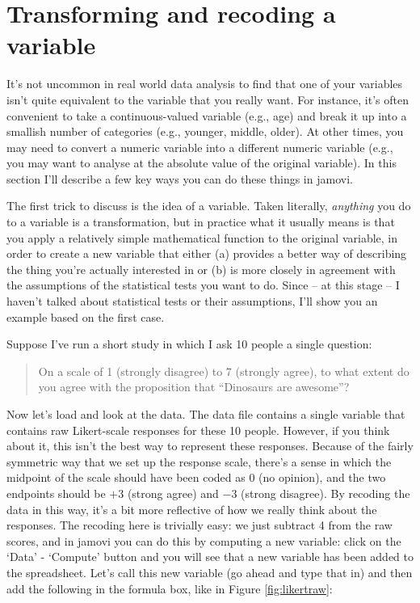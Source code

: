 \section{Transforming and recoding a variable~\label{sec:transform}}

It's not uncommon in real world data analysis to find that one of your variables isn't quite equivalent to the variable that you really want. For instance, it's often convenient to take a continuous-valued variable (e.g., age) and break it up into a smallish number of categories (e.g., younger, middle, older). At other times, you may need to convert a numeric variable into a different numeric variable (e.g., you may want to analyse at the absolute value of the original variable). In this section I'll describe a few key ways you can do these things in jamovi. 



The first trick to discuss is the idea of  a variable. Taken literally, {\it anything} you do to a variable is a transformation, but in practice what it usually means is that you apply a relatively simple mathematical function to the original variable, in order to create a new variable that either (a) provides a better way of describing the thing you're actually interested in or (b) is more closely in agreement with the assumptions of the statistical tests you want to do.  Since -- at this stage -- I haven't talked about statistical tests or their assumptions, I'll show you an example based on the first case. 

Suppose I've run a short study in which I ask 10 people a single question: 
\begin{quote}
On a scale of 1 (strongly disagree) to 7 (strongly agree), to what extent do you agree with the proposition that ``Dinosaurs are awesome''?
\end{quote}
Now let's load and look at the data. The data file  contains a single variable that contains raw Likert-scale responses for these 10 people. However, if you think about it, this isn't the best way to represent these responses. Because of the fairly symmetric way that we set up the response scale, there's a sense in which the midpoint of the scale should have been coded as 0 (no opinion), and the two endpoints should be $+3$ (strong agree) and $-3$ (strong disagree). By recoding the data in this way, it's a bit more reflective of how we really think about the responses. The recoding here is trivially easy: we just subtract 4 from the raw scores, and in jamovi you can do this by computing a new variable: click on the `Data' - `Compute' button and you will see that a new variable has been added to the spreadsheet. Let's call this new variable  (go ahead and type that in) and then add the following in the formula box, like in Figure \ref{fig:likertraw}: \\ 

